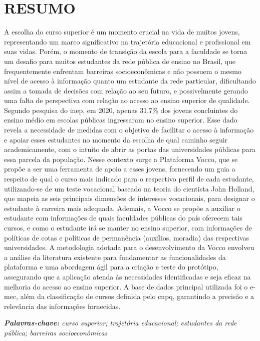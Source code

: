 \label{resumo}
\chapter*{RESUMO}
A escolha do curso superior é um momento crucial na vida de muitos jovens, representando um marco significativo na trajetória educacional e profissional em suas vidas. Porém, o momento de transição da escola para a faculdade se torna um desafio para muitos estudantes da rede pública de ensino no Brasil, que frequentemente enfrentam barreiras socioeconômicas e não possuem o mesmo nível de acesso à informação quanto um estudante da rede particular, dificultando assim a tomada de decisões com relação ao seu futuro, e possivelmente gerando uma falta de perspectiva com relação ao acesso ao ensino superior de qualidade. Segundo pesquisa do \ac{inep}, em 2020, apenas 31,7\% dos jovens concluintes do ensino médio em escolas públicas ingressaram no ensino superior. Esse dado revela a necessidade de medidas com o objetivo de facilitar o acesso à informação e apoiar esses estudantes no momento da escolha de qual caminho seguir academicamente, com o intuito de abrir as portas das universidades públicas para essa parcela da população. Nesse contexto surge a Plataforma Vocco, que se propõe a ser uma ferramenta de apoio a esses jovens, fornecendo um guia a respeito de qual o curso mais indicado para o respectivo perfil de cada estudante, utilizando-se de um teste vocacional baseado na teoria do cientista John Holland, que mapeia as seis principais dimensões de interesses vocacionais, para designar o estudante à carreira mais adequada. Ademais, a Vocco se propõe a auxiliar o estudante com informações de quais faculdades públicas do país oferecem tais cursos, e como o estudante irá se manter no ensino superior, com informações de políticas de cotas e políticas de permanência (auxílios, moradia) das respectivas universidades. A metodologia adotada para o desenvolvimento da Vocco envolveu a análise da literatura existente para fundamentar as funcionalidades da plataforma e uma abordagem ágil para a criação e teste do protótipo, assegurando que a aplicação atenda às necessidades identificadas e seja eficaz na melhoria do acesso ao ensino superior. A base de dados principal utilizada foi o \ac{e-mec}, além da classificação de cursos definida pelo \ac{cnpq}, garantindo a precisão e a relevância das informações fornecidas.



\vspace{3\baselineskip}
\textit{\textbf{Palavras-chave:} curso superior; trajetória educacional; estudantes da rede pública; barreiras socioeconômicas}


